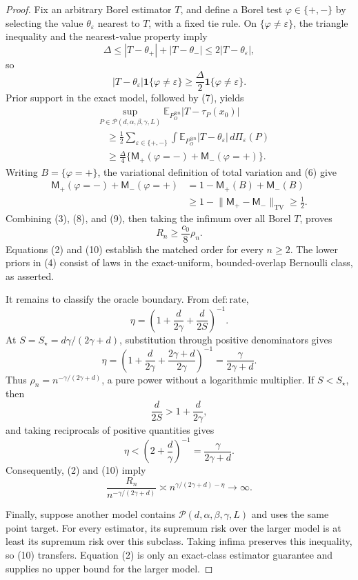 \documentclass{article}
\begin{document}
\begin{proof}
Fix an arbitrary Borel estimator \(T\), and define a Borel test \(\varphi\in\{+,-\}\) by selecting the value \(\theta_\varepsilon\) nearest to \(T\), with a fixed tie rule.  On \(\{\varphi\ne\varepsilon\}\), the triangle inequality and the nearest-value property imply
\[
 \Delta\le|T-\theta_+|+|T-\theta_-|
 \le2|T-\theta_\varepsilon|,
\]
so
\[
 |T-\theta_\varepsilon|\mathbf 1\{\varphi\ne\varepsilon\}
 \ge\frac\Delta2\mathbf 1\{\varphi\ne\varepsilon\}.         \tag{7}
\]
Prior support in the exact model, followed by (7), yields
\[
\begin{aligned}
 &\sup_{P\in\mathcal P(d,\alpha,\beta,\gamma,L)}
 \mathbb E_{P_O^{\otimes n}}|T-\tau_P(x_0)|\\
 &\quad\ge\frac12\sum_{\varepsilon\in\{+,-\}}
 \int\mathbb E_{P_O^{\otimes n}}|T-\theta_\varepsilon|\,d\Pi_\varepsilon(P)\\
 &\quad\ge\frac\Delta4
 \{\mathsf M_+(\varphi=-)+\mathsf M_-(\varphi=+)\}.           \tag{8}
\end{aligned}
\]
Writing \(B=\{\varphi=+\}\), the variational definition of total variation and (6) give
\[
\begin{aligned}
 \mathsf M_+(\varphi=-)+\mathsf M_-(\varphi=+)
 &=1-\mathsf M_+(B)+\mathsf M_-(B)\\
 &\ge1-\lVert\mathsf M_+-\mathsf M_-\rVert_{\mathrm{TV}}
 \ge\frac12.                                                     \tag{9}
\end{aligned}
\]
Combining (3), (8), and (9), then taking the infimum over all Borel \(T\), proves
\[
 R_n\ge\frac{c_0}{8}\rho_n.                                   \tag{10}
\]
Equations (2) and (10) establish the matched order for every \(n\ge2\).  The lower priors in (4) consist of laws in the exact-uniform, bounded-overlap Bernoulli class, as asserted.

It remains to classify the oracle boundary.  From \(\mathrm{def:rate}\),
\[
 \eta=\left(1+\frac d{2\gamma}+\frac d{2S}\right)^{-1}.
\]
At \(S=S_\star=d\gamma/(2\gamma+d)\), substitution through positive denominators gives
\[
 \eta=\left(1+\frac d{2\gamma}+\frac{2\gamma+d}{2\gamma}\right)^{-1}
 =\frac\gamma{2\gamma+d}.                                      \tag{11}
\]
Thus \(\rho_n=n^{-\gamma/(2\gamma+d)}\), a pure power without a logarithmic multiplier.  If \(S<S_\star\), then
\[
 \frac d{2S}>1+\frac d{2\gamma},
\]
and taking reciprocals of positive quantities gives
\[
 \eta<\left(2+\frac d\gamma\right)^{-1}
 =\frac\gamma{2\gamma+d}.                                      \tag{12}
\]
Consequently, (2) and (10) imply
\[
 \frac{R_n}{n^{-\gamma/(2\gamma+d)}}
 \asymp n^{\gamma/(2\gamma+d)-\eta}\longrightarrow\infty.    \tag{13}
\]

Finally, suppose another model contains \(\mathcal P(d,\alpha,\beta,\gamma,L)\) and uses the same point target.  For every estimator, its supremum risk over the larger model is at least its supremum risk over this subclass.  Taking infima preserves this inequality, so (10) transfers.  Equation (2) is only an exact-class estimator guarantee and supplies no upper bound for the larger model.
\end{proof}
\end{document}
